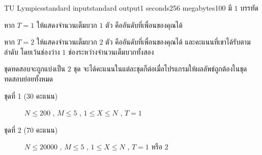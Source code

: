 \documentclass[11pt,a4paper]{article}
\begin{document}
\begin{problem}{TU Lympics}{standard input}{standard output}{1 seconds}{256 megabytes}{100}
\OutputFile
มี $1$ บรรทัด 

หาก $T = 1$ ให้แสดงจำนวนเต็มบวก $1$ ตัว คืออันดับที่เพื่อนของคุณได้ 

หาก $T = 2$ ให้แสดงจำนวนเต็มบวก $2$ ตัว คืออันดับที่เพื่อนของคุณได้ และคะแนนที่เขาได้รับตามลำดับ โดยเว้นช่องว่าง $1$ ช่องระหว่างจำนวนเต็มบวกทั้งสอง

\Scoring
ชุดทดสอบจะถูกแบ่งเป็น $2$ ชุด จะได้คะแนนในแต่ละชุดก็ต่อเมื่อโปรแกรมให้ผลลัพธ์ถูกต้องในชุดทดสอบย่อยทั้งหมด

\begin{description}

\item[ชุดที่ 1 (30 คะแนน)]  $N \leq 200$ , $M \leq 5$ , $1 \leq X \leq N$ , $T=1$

\item[ชุดที่ 2 (70 คะแนน)]  $N\leq20000$  , $M\leq5$ , $1 \leq X \leq N $ , $T=1$ หรือ $2$

\end{description}

\Examples

\begin{example}
%
%
\end{example}

\end{problem}

\pagebreak
\end{document}
